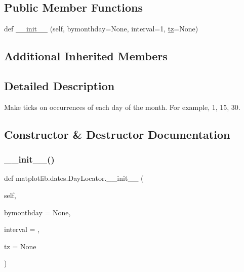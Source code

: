 \subsection*{Public Member Functions}
\begin{DoxyCompactItemize}
\item 
def \hyperlink{classmatplotlib_1_1dates_1_1DayLocator_ab0123c68426083f8aa80743d4aa6ebe7}{\+\_\+\+\_\+init\+\_\+\+\_\+} (self, bymonthday=None, interval=1, \hyperlink{classmatplotlib_1_1dates_1_1DateLocator_aa18faf34dbf00ed4820535b64cd7194e}{tz}=None)
\end{DoxyCompactItemize}
\subsection*{Additional Inherited Members}


\subsection{Detailed Description}
\begin{DoxyVerb}Make ticks on occurrences of each day of the month.  For example,
1, 15, 30.
\end{DoxyVerb}
 

\subsection{Constructor \& Destructor Documentation}
\mbox{\label{classmatplotlib_1_1dates_1_1DayLocator_ab0123c68426083f8aa80743d4aa6ebe7}} 
\subsubsection{\texorpdfstring{\+\_\+\+\_\+init\+\_\+\+\_\+()}{\_\_init\_\_()}}
{\footnotesize\ttfamily def matplotlib.\+dates.\+Day\+Locator.\+\_\+\+\_\+init\+\_\+\+\_\+ (\begin{DoxyParamCaption}\item[{}]{self,  }\item[{}]{bymonthday = {\ttfamily None},  }\item[{}]{interval = {},  }\item[{}]{tz = {\ttfamily None} }\end{DoxyParamCaption})}

